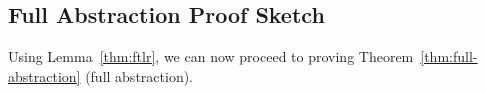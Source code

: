 \subsection{Full Abstraction Proof Sketch}
\label{subsec:proof-sketch}
Using Lemma~\ref{thm:ftlr}, we can now proceed to proving Theorem~\ref{thm:full-abstraction} (full abstraction).

